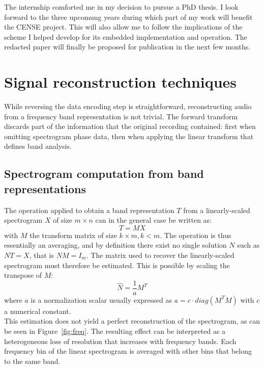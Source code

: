 \documentclass[12pt,times,onecolumn]{article}
\begin{document}
The internship comforted me in my decision to pursue a PhD thesis. I look forward to the three upcomung years during which part of my work will benefit the CENSE project. This will also allow me to follow the implications of the scheme I helped develop for its embedded implementation and operation. The redacted paper will finally be proposed for publication in the next few months.

\clearpage
\appendix
\section{Signal reconstruction techniques}
\label{sigrec}
While reversing the data encoding step is straightforward, reconstructing audio from a frequency band representation is not trivial. The forward transform discards part of the information that the original recording contained: first when omitting spectrogram phase data, then when applying the linear transform that defines band analysis.
\subsection{Spectrogram computation from band representations}
The operation applied to obtain a band representation $T$ from a linearly-scaled spectrogram $X$ of size $m\times n$ can in the general case be written as:
\begin{equation}
T = MX
\end{equation}
with $M$ the transform matrix of size $k\times m, k<m$. The operation is thus essentially an averaging, and by definition there exist no single solution $N$ such as $NT = X$, that is $NM = I_m$. The matrix used to recover the linearly-scaled spectrogram must therefore be estimated. This is possible by scaling the transpose of $M$:
\begin{equation}
\hat{N} = \frac{1}{a}M^T
\end{equation}
where $a$ is a normalization scalar usually expressed as $a = c\cdot diag(M^TM)$ with $c$ a numerical constant.\\

This estimation does not yield a perfect reconstruction of the spectrogram, as can be seen in Figure~\ref{fig:freq}. The resulting effect can be interpreted as a heterogeneous loss of resolution that increases with frequency bands. Each frequency bin of the linear spectrogram is averaged with other bins that belong to the same band.
\end{document}
